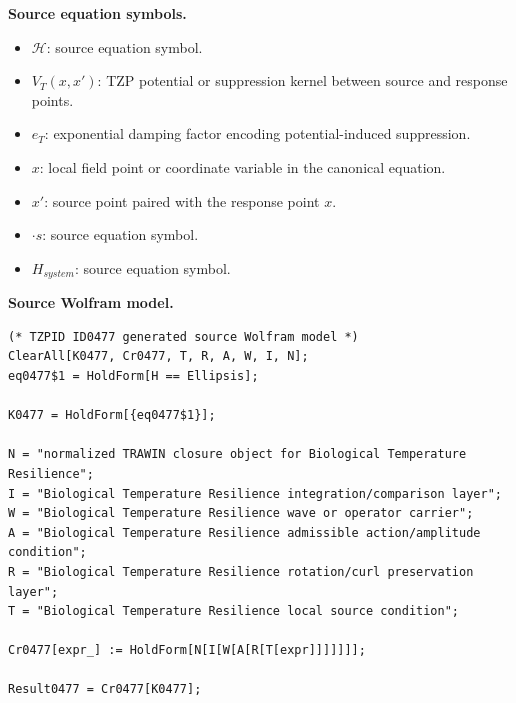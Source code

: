 \begin{minipage}[t]{0.49\linewidth}
\begingroup
\small
\raggedright
\textbf{Source equation symbols.}\par
\begin{itemize}[leftmargin=1.35em,itemsep=1pt,topsep=1pt,parsep=0pt]
    \item $\mathcal{H}$: source equation symbol.
    \item $V_{T}(x,x')$: TZP potential or suppression kernel between source and response points.
    \item $e_T$: exponential damping factor encoding potential-induced suppression.
    \item $x$: local field point or coordinate variable in the canonical equation.
    \item $x'$: source point paired with the response point $x$.
    \item $\cdot s$: source equation symbol.
    \item $H_{system}$: source equation symbol.
\end{itemize}
\endgroup
\end{minipage}\hfill
\begin{minipage}[t]{0.47\linewidth}
\begingroup
\scriptsize
\raggedright
\textbf{Source Wolfram model.}\par
\begin{Verbatim}[fontsize=\tiny,breaklines=true,breakanywhere=true]
(* TZPID ID0477 generated source Wolfram model *)
ClearAll[K0477, Cr0477, T, R, A, W, I, N];
eq0477$1 = HoldForm[H == Ellipsis];

K0477 = HoldForm[{eq0477$1}];

N = "normalized TRAWIN closure object for Biological Temperature Resilience";
I = "Biological Temperature Resilience integration/comparison layer";
W = "Biological Temperature Resilience wave or operator carrier";
A = "Biological Temperature Resilience admissible action/amplitude condition";
R = "Biological Temperature Resilience rotation/curl preservation layer";
T = "Biological Temperature Resilience local source condition";

Cr0477[expr_] := HoldForm[N[I[W[A[R[T[expr]]]]]]];

Result0477 = Cr0477[K0477];
\end{Verbatim}
\endgroup
\end{minipage}

